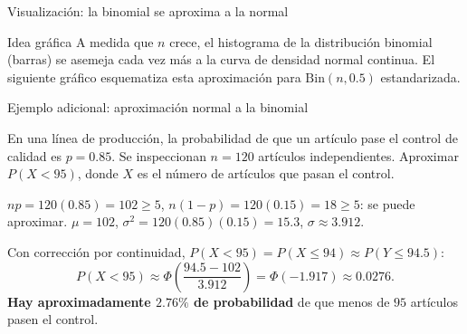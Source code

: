\documentclass[aspectratio=169,11pt]{beamer}
\begin{document}
\begin{frame}{Visualización: la binomial se aproxima a la normal}
\begin{block}{Idea gráfica}
A medida que $n$ crece, el histograma de la distribución binomial (barras) se asemeja cada vez más a la curva de densidad normal continua. El siguiente gráfico esquematiza esta aproximación para $\text{Bin}(n,0.5)$ estandarizada.
\end{block}

\begin{center}
\end{center}
\end{frame}

\begin{frame}{Ejemplo adicional: aproximación normal a la binomial}
\begin{example}
En una línea de producción, la probabilidad de que un artículo pase el control de calidad es $p=0.85$. Se inspeccionan $n=120$ artículos independientes. Aproximar $P(X < 95)$, donde $X$ es el número de artículos que pasan el control.
\end{example}

\medskip
$np=120(0.85)=102 \geq 5$, $n(1-p)=120(0.15)=18\geq5$: se puede aproximar. $\mu=102$, $\sigma^2=120(0.85)(0.15)=15.3$, $\sigma\approx3.912$.

Con corrección por continuidad, $P(X<95) = P(X\leq 94) \approx P(Y\leq 94.5)$:
\[
P(X<95) \approx \Phi\left(\frac{94.5-102}{3.912}\right) = \Phi(-1.917) \approx 0.0276.
\]
\textbf{Hay aproximadamente $2.76\%$ de probabilidad} de que menos de $95$ artículos pasen el control.
\end{frame}
\end{document}
